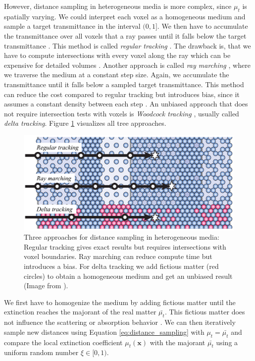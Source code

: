 However, distance sampling in heterogeneous media is more complex, since $\mu_t$ is spatially varying.
We could interpret each voxel as a homogeneous medium and sample a target transmittance in the interval $(0, 1]$.
We then have to accumulate the transmittance over all voxels that a ray passes until it falls below the target transmittance \cite{novak_overview}.
This method is called \textit{regular tracking} \cite{sutton_regular_tracking}.
The drawback is, that we have to compute intersections with every voxel along the ray which can be expensive for detailed volumes \cite{novak_overview}.
Another approach is called \textit{ray marching} \cite{perlin_hypertexture}, where we traverse the medium at a constant step size.
Again, we accumulate the transmittance until it falls below a sampled target transmittance.
This method can reduce the cost compared to regular tracking but introduces bias, since it assumes a constant density between each step \cite{novak_overview}.
An unbiased approach that does not require intersection tests with voxels is \textit{Woodcock tracking} \cite{woodcock}, usually called \textit{delta tracking}.
Figure \ref{fig:novak_distance_sampling} visualizes all tree approaches.
\begin{figure}[t]
    \centering
    \includegraphics[width=0.7\linewidth]{img/novak_distance_sampling.png}
    \caption[Approaches for distance sampling in heterogeneous media]{Three approaches for distance sampling in heterogeneous media: Regular tracking gives exact results but requires intersections with voxel boundaries. Ray marching can reduce compute time but introduces a bias. For delta tracking we add fictious matter (red circles) to obtain a homogeneous medium and get an unbiased result (Image from \cite{novak_overview}).}
    \label{fig:novak_distance_sampling}
\end{figure}
We first have to homogenize the medium by adding fictious matter until the extinction reaches the majorant of the real matter $\bar{\mu_t}$.
This fictious matter does not influence the scattering or absorption behavior \cite{novak_overview}.
We can then iteratively sample new distances using Equation \ref{eq:distance_sampling} with $\mu_t=\bar{\mu_t}$ and compare the local extinction coefficient $\mu_t(\boldsymbol{x})$ with the majorant $\bar{\mu_t}$ using a uniform random number $\xi\in[0,1)$.

